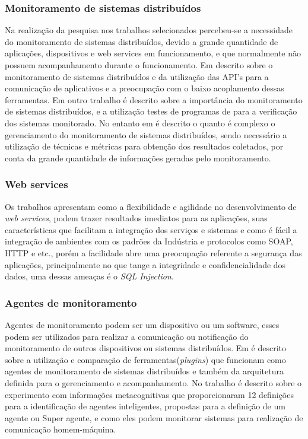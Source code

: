 \subsubsection{Monitoramento de sistemas distribuídos}
Na realização da pesquisa nos trabalhos selecionados percebeu-se a necessidade do monitoramento de sistemas distribuídos, devido a grande quantidade de  aplicações, dispositivos e web services em funcionamento, e que normalmente não possuem acompanhamento durante o funcionamento. Em \cite{cirstoiu2007monitoring} descrito sobre o monitoramento de sistemas distribuídos e da utilização das API's para a comunicação de aplicativos e a preocupação com o baixo acoplamento dessas ferramentas. Em outro trabalho \cite{joyce1987monitoring} é descrito sobre a importância do monitoramento de sistemas distribuídos, e a utilização testes de programas de para a verificação dos sistemas monitorado. No entanto em \cite{abdu1996monitoring} é descrito o quanto é complexo o gerenciamento do monitoramento de sistemas distribuídos, sendo necessário a utilização de técnicas e métricas para obtenção dos resultados coletados, por conta da grande quantidade de informações geradas pelo monitoramento.  

\subsubsection{Web services}

Os trabalhos \cite{patil2012remote,casola2009sensim} apresentam como a flexibilidade e agilidade no desenvolvimento de \textit{web services}, podem trazer resultados imediatos para as aplicações, suas características que facilitam a integração dos serviços e sistemas e como é fácil a integração de ambientes com os padrões da Indústria e protocolos como SOAP, HTTP e etc., porém a facilidade abre uma preocupação referente a segurança das aplicações, principalmente no que tange a integridade e confidencialidade dos dados, uma dessas ameaças é o \textit{SQL Injection}. 

\subsubsection{Agentes de monitoramento}

Agentes de monitoramento podem ser um dispositivo ou um software, esses podem ser utilizados para realizar a comunicação ou notificação do monitoramento de outros dispositivos ou sistemas distribuídos. Em \cite{smith2008flexible} é descrito sobre a utilização e comparação de ferramentas(\textit{plugins}) que funcionam como agentes de monitoramento de sistemas distribuídos e também da arquitetura definida para o gerenciamento e acompanhamento. No trabalho \cite{puatruct2010agent} é descrito sobre o experimento com informações metacognitivas que proporcionaram 12 definições para a identificação de agentes inteligentes, propostas para a definição de um agente ou Super agente, e como eles podem monitorar sistemas para realização de comunicação homem-máquina.


